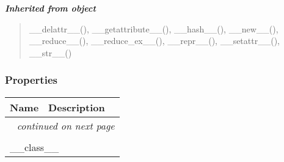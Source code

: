 \large{\textbf{\textit{Inherited from object}}}

\begin{quote}
\_\_delattr\_\_(), \_\_getattribute\_\_(), \_\_hash\_\_(), \_\_new\_\_(), \_\_reduce\_\_(), \_\_reduce\_ex\_\_(), \_\_repr\_\_(), \_\_setattr\_\_(), \_\_str\_\_()
\end{quote}


  \subsubsection{Properties}

    \vspace{-1cm}
\hspace{\varindent}\begin{longtable}{|p{\varnamewidth}|p{\vardescrwidth}|l}
\cline{1-2}
\cline{1-2} \centering \textbf{Name} & \centering \textbf{Description}& \\
\cline{1-2}
\endhead\cline{1-2}\multicolumn{3}{r}{\small\textit{continued on next page}}\\\endfoot\cline{1-2}
\endlastfoot\multicolumn{2}{|l|}{\textit{Inherited from object}}\\
\multicolumn{2}{|p{\varwidth}|}{\raggedright \_\_class\_\_}\\
\cline{1-2}
\end{longtable}

